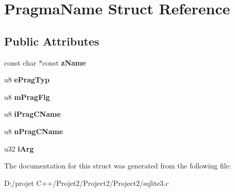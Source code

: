 \hypertarget{struct_pragma_name}{}\section{Pragma\+Name Struct Reference}
\label{struct_pragma_name}
\subsection*{Public Attributes}
\begin{DoxyCompactItemize}
\item 
\mbox{\label{struct_pragma_name_ade7aeb859181f74f7b9b7a88481ed2a3}} 
const char $\ast$const {\bfseries z\+Name}
\item 
\mbox{\label{struct_pragma_name_a62d8aae764f7d69ea67d62645d05d327}} 
u8 {\bfseries e\+Prag\+Typ}
\item 
\mbox{\label{struct_pragma_name_a299da7e18dfd00b25463b16062dbca09}} 
u8 {\bfseries m\+Prag\+Flg}
\item 
\mbox{\label{struct_pragma_name_ad979162577450238dc72b1a2c11ddbfb}} 
u8 {\bfseries i\+Prag\+C\+Name}
\item 
\mbox{\label{struct_pragma_name_ab44421a7317447590f3127ad383b5715}} 
u8 {\bfseries n\+Prag\+C\+Name}
\item 
\mbox{\label{struct_pragma_name_a98bfb2789703b42fe3964df26c0f6b8a}} 
u32 {\bfseries i\+Arg}
\end{DoxyCompactItemize}


The documentation for this struct was generated from the following file\+:\begin{DoxyCompactItemize}
\item 
D\+:/projet C++/\+Projet2/\+Project2/\+Project2/sqlite3.\+c\end{DoxyCompactItemize}
